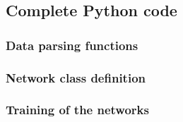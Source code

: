 \documentclass[letterpaper,headings=standardclasses]{scrartcl}
\begin{document}
\subsection{Complete Python code}

\subsubsection{Data parsing functions}



\subsubsection{Network class definition}



\subsubsection{Training of the networks}


\end{document}
